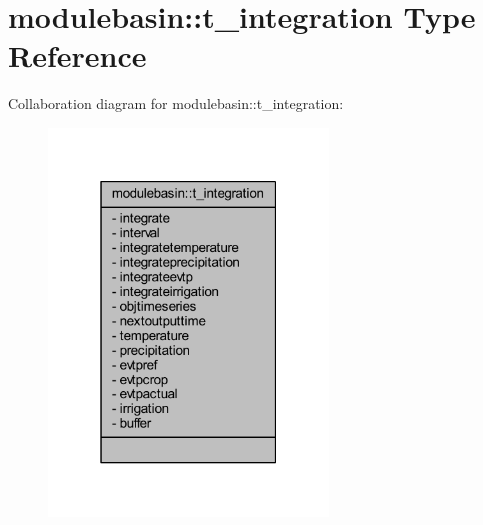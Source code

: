 \hypertarget{structmodulebasin_1_1t__integration}{}\section{modulebasin\+:\+:t\+\_\+integration Type Reference}
\label{structmodulebasin_1_1t__integration}


Collaboration diagram for modulebasin\+:\+:t\+\_\+integration\+:\nopagebreak
\begin{figure}[H]
\begin{center}
\leavevmode
\includegraphics[width=211pt]{structmodulebasin_1_1t__integration__coll__graph}
\end{center}
\end{figure}
